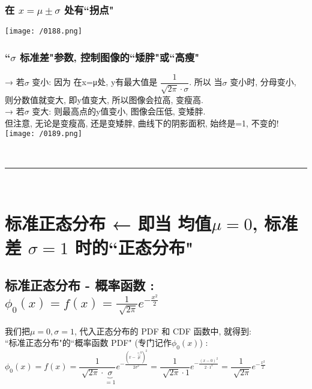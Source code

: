 \documentclass[UTF8]{ctexart}
\begin{document}
\subsubsection{在 $x=\mu \pm \sigma $ 处有``拐点"}
\texttt{[image: /0188.png]} 



\subsubsection{``$\sigma$ 标准差"参数, 控制图像的``矮胖"或``高瘦"}

→ 若$\sigma$ 变小: 因为 在x=μ处, y有最大值是 $ \dfrac{1} {\sqrt{2π} \cdot \sigma}$. 所以 当$\sigma$ 变小时, 分母变小, 则分数值就变大, 即y值变大, 所以图像会拉高, 变瘦高. \\
→ 若$\sigma$ 变大: 则最高点的y值变小, 图像会压低, 变矮胖. \\

但注意, 无论是变瘦高, 还是变矮胖, 曲线下的阴影面积, 始终是=1, 不变的! \\

\texttt{[image: /0189.png]} 




~\\
\hrule
~\\



\section{标准正态分布 ← 即当 均值$\mu=0$, 标准差 $\sigma=1$ 时的``正态分布"}


\subsection{标准正态分布 - 概率函数 : $\boxed{
		\phi _0(x)=f\left( x \right) =\frac{1}{\sqrt[]{2\pi}}e^{-\frac{x^2}{2}}		
	}$}


我们把$\mu=0, \sigma=1$, 代入正态分布的 PDF 和 CDF 函数中, 就得到: \\

``标准正态分布"的``概率函数 PDF" (专门记作$\phi _0(x)$) :\\
$
\phi _0(x)=f\left( x \right) =\dfrac{1}{\sqrt[]{2\pi}\cdot \underset{=1}{\underbrace{\sigma }}}e^{-\frac{(x-\overset{=0}{\overbrace{\mu }})^2}{2\sigma ^2}}
=\dfrac{1}{\sqrt[]{2\pi}\cdot 1}e^{-\frac{(x-0)^2}{2\cdot 1^2}}
=\dfrac{1}{\sqrt[]{2\pi}}e^{-\frac{x^2}{2}}
$ \\
\end{document}

